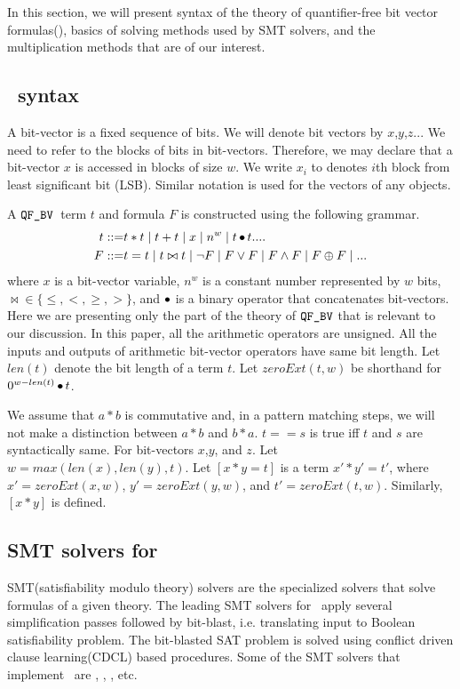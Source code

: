 In this section, we will present syntax of
the theory of quantifier-free bit vector formulas(\qfbv),
basics of solving methods used by SMT solvers,
and the multiplication methods that are of our interest. 

%

\subsection{\qfbv~syntax}

A bit-vector is a fixed sequence of bits.
%
We will denote bit vectors by $x$,$y$,$z$...
%
We need to refer to the blocks of bits in 
bit-vectors.
Therefore, we may declare that a bit-vector $x$
is accessed in blocks of size $w$.
%
We write $x_i$ to denotes $i$th block from
least significant bit (LSB).
%
Similar notation is used for the vectors of any objects.

A $\texttt{QF\_BV}$~term $t$ and formula $F$ is constructed using
the following grammar.
\begin{align*}
t ::= & t * t \mid t + t \mid x \mid n^w \mid t \mathop{\bullet} t  ....\\
F ::= & t = t \mid t \bowtie t \mid \lnot F \mid F \lor F \mid F \land F \mid F \oplus F \mid ... 
\end{align*}
where $x$ is a bit-vector variable, 
$n^w$ is a constant number represented by $w$ bits,
$\bowtie \in \{\leq , <, \geq, > \}$, and
$\mathop{\bullet}$ is a binary operator that concatenates bit-vectors.
%
Here we are presenting only the  part of the theory
of $\texttt{QF\_BV}$ that is relevant to our discussion.
%
In this paper, all the arithmetic operators are unsigned.
%
All the inputs and outputs of arithmetic bit-vector operators 
have same bit length.
%
Let $len(t)$ denote the bit length of a term $t$.
%
Let $zeroExt(t,w)$ be shorthand for  $0^{w-len(t)}\mathop{\bullet} t$.

We assume that $a * b$ is commutative and, in a pattern matching
steps, we will not make a distinction between $a*b$ and $b*a$.
%
$t == s$ is true iff $t$ and $s$ are syntactically same.
%
For bit-vectors $x$,$y$, and $z$. Let $w= max( len(x),len(y), t)$.
%
Let $[x*y = t]$ is a term $x'*y'=t'$, where 
$x' = zeroExt(x,w)$, $y' = zeroExt(y,w)$, and $t' = zeroExt(t,w)$.
%
Similarly, $[x*y]$ is defined.

\subsection{SMT solvers for \qfbv}

SMT(satisfiability modulo theory)
solvers are the specialized solvers that solve 
formulas of a given theory.
%
The leading SMT solvers for \qfbv~apply several simplification
passes followed by bit-blast, i.e. translating input to Boolean
satisfiability problem.
%
The bit-blasted SAT problem is solved using conflict driven clause
learning(CDCL) based procedures.
%
Some of the SMT solvers that implement \qfbv~are
\zthree, \boolector, \cvcfour, etc.

